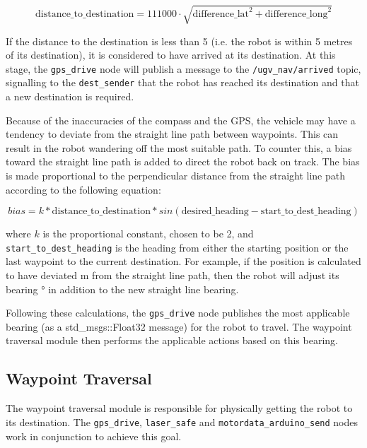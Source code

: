 \documentclass[titlepage,12pt,a4paper]{article}
\begin{document}
\pagebreak


\begin{equation}
	\text{distance\_to\_destination} = 111000 \cdot \sqrt{\text{difference\_lat}^2+ \text{difference\_long}^2}
\end{equation}

If the distance to the destination is less than 5 (i.e. the robot is within 5 metres of its destination), it is considered to have arrived at its destination. At this stage, the \verb|gps_drive| node will publish a message to the \verb|/ugv_nav/arrived| topic, signalling to the \verb|dest_sender| that the robot has reached its destination and that a new destination is required.

Because of the inaccuracies of the compass and the GPS, the vehicle may have a tendency to deviate from the straight line path between waypoints. This can result in the robot wandering off the most suitable path. To counter this, a bias toward the straight line path is added to direct the robot back on track. The bias is made proportional to the perpendicular distance from the straight line path according to the following equation:

\begin{equation}
bias = k * \text{distance\_to\_destination} * sin(\text{desired\_heading}-\text{start\_to\_dest\_heading})
\end{equation}

where \(k\) is the proportional constant, chosen to be 2, and \verb|start_to_dest_heading| is the heading from either the starting position or the last waypoint to the current destination. For example, if the position is calculated to have deviated \unit[5]{m} from the straight line path, then the robot will adjust its bearing \unit[10]{\degree} in addition to the new straight line bearing.


Following these calculations, the \verb|gps_drive| node publishes the most applicable bearing (as a std\_msgs::Float32 message) for the robot to travel. The waypoint traversal module then performs the applicable actions based on this bearing.


\subsection{Waypoint Traversal}
The waypoint traversal module is responsible for physically getting the robot to its destination. The \verb|gps_drive|, \verb|laser_safe| and \verb|motordata_arduino_send| nodes work in conjunction to achieve this goal.
\end{document}
